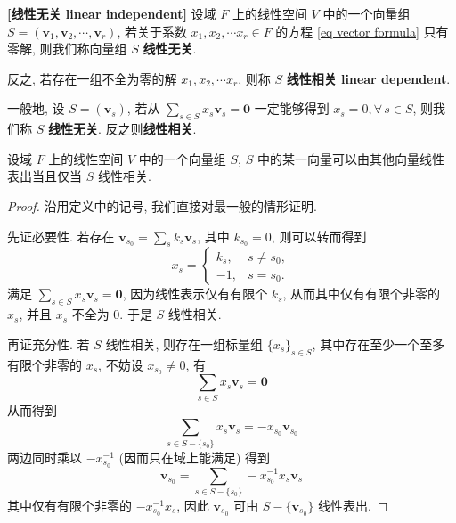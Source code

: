 \documentclass[UTF8]{book}
\begin{document}
\begin{definition}
    \textbf{[线性无关 linear independent]} 
    设域 $F$ 上的线性空间 $V$ 中的一个向量组 
    $S=(\boldsymbol{v}_1,\boldsymbol{v}_2,\cdots,\boldsymbol{v}_r)$, 
    若关于系数 $x_1,x_2,\cdots x_r \in F$ 的方程 
    \eqref{eq vector formula} 只有零解, 
    则我们称向量组 $S$ \textbf{线性无关}. 
    
    反之, 若存在一组不全为零的解 $x_1,x_2,\cdots x_r$, 
    则称 $S$ \textbf{线性相关 linear dependent}. 

    一般地, 设 $S = (\boldsymbol{v}_s)$, 
    若从 $\sum_{s\in S} x_s \boldsymbol{v}_s =  \boldsymbol{0}$ 
    一定能够得到 $x_s = 0, \forall\,s\in S$, 
    则我们称 $S$ \textbf{线性无关}. 反之则\textbf{线性相关}. 
\end{definition}

\begin{proposition} \label{prop linear dependent}
    设域 $F$ 上的线性空间 $V$ 中的一个向量组 $S$, 
    $S$ 中的某一向量可以由其他向量线性表出当且仅当 $S$ 线性相关. 
\end{proposition}

\begin{proof}
    沿用定义中的记号, 我们直接对最一般的情形证明. 

    先证必要性. 若存在  
    $\boldsymbol{v}_{s_0} = \sum_{s} k_{s} \boldsymbol{v}_s$, 
    其中 $k_{s_0} = 0$, 
    则可以转而得到 
    $$
    x_{s} = 
    \begin{cases}
        k_{s}, & s \neq s_0, \\
        -1, & s = s_0.
    \end{cases}
    $$
    满足 $\sum_{s\in S} x_s \boldsymbol{v}_s =  \boldsymbol{0}$, 
    因为线性表示仅有有限个 $k_s$, 从而其中仅有有限个非零的 $x_s$, 
    并且 $x_s$ 不全为 0. 于是 $S$ 线性相关. 

    再证充分性. 
    若 $S$ 线性相关, 则存在一组标量组 
    $\{x_s\}_{s\in S}$, 其中存在至少一个至多有限个非零的 $x_s$, 
    不妨设 $x_{s_0} \neq 0$, 
    有 
    $$ \sum_{s \in S} x_s \boldsymbol{v}_s = \boldsymbol{0}$$ 
    从而得到 
    $$ \sum_{s \in S-\{s_0\}} x_s \boldsymbol{v}_s = 
    -x_{s_{0}}\boldsymbol{v}_{s_0}$$ 
    两边同时乘以 $-x_{s_0}^{-1}$ (因而只在域上能满足) 得到 
    $$ \boldsymbol{v}_{s_0} = 
    \sum_{s \in S-\{s_0\}}-x_{s_0}^{-1} x_s \boldsymbol{v}_s$$ 
    其中仅有有限个非零的 $-x_{s_0}^{-1} x_s $, 
    因此 $\boldsymbol{v}_{s_0}$ 可由 
    $S-\{\boldsymbol{v}_{s_0}\}$ 线性表出. 
    
\end{proof}
\end{document}
